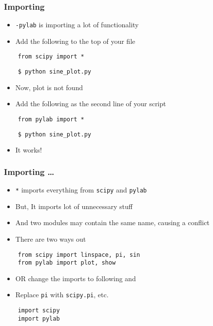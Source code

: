 \begin{frame}[fragile]
  \frametitle{Importing}
  \begin{itemize}
  \item \texttt{-pylab} is importing a lot of functionality
  \item Add the following to the top of your file
  \end{itemize}
  \begin{lstlisting}
    from scipy import *
  \end{lstlisting}
  \begin{lstlisting}
    $ python sine_plot.py
  \end{lstlisting} %
  \begin{itemize}
  \item Now, plot is not found
  \item Add the following as the second line of your script
  \end{itemize}
  \begin{lstlisting}
    from pylab import *
  \end{lstlisting}
  \begin{lstlisting}
    $ python sine_plot.py
  \end{lstlisting} %
  \begin{itemize}
  \item It works!
  \end{itemize}
\end{frame}

\begin{frame}[fragile]
  \frametitle{Importing \ldots}
  \begin{itemize}
  \item \texttt{*} imports everything from \texttt{scipy} and
    \texttt{pylab}
  \item But, It imports lot of unnecessary stuff
  \item And two modules may contain the same name, causing a conflict
  \item There are two ways out
  \end{itemize}
  \begin{lstlisting}
    from scipy import linspace, pi, sin
    from pylab import plot, show
  \end{lstlisting}
  \begin{itemize}
  \item OR change the imports to following and 
  \item Replace \texttt{pi} with \texttt{scipy.pi}, etc. 
  \end{itemize}
  \begin{lstlisting}
    import scipy
    import pylab
  \end{lstlisting}
\end{frame}

